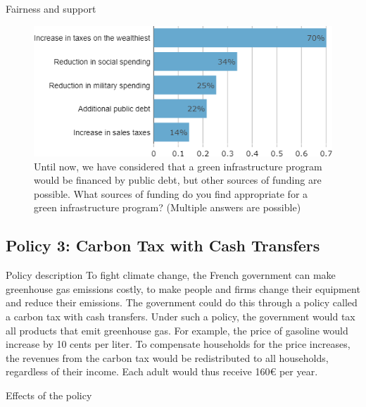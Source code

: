 \begin{framefont}{\small}
\begin{frame}{Fairness and support}
\end{frame}

\begin{frame}{}%
\begin{figure}[h!]
\centering
\caption{Until now, we have considered that a green infrastructure program would be financed by public debt, but other sources of funding are possible.
What sources of funding do you find appropriate for a green infrastructure program? (Multiple answers are possible)}
\includegraphics[width=.7\paperwidth]{../figures/FR/investments_funding_FR.png}
\end{figure}
\end{frame}

\subsection{Policy 3: Carbon Tax with Cash Transfers}

\begin{frame}{Policy description}%
To fight climate change, the French government can make greenhouse gas emissions costly, to make people and firms change their equipment and reduce their emissions. The government could do this through a policy called a carbon tax with cash transfers. Under such a policy, the government would tax all products that emit greenhouse gas. For example, the price of gasoline would increase by 10 cents per liter. To compensate households for the price increases, the revenues from the carbon tax would be redistributed to all households, regardless of their income. Each adult would thus receive 160\euro{} per year.
\end{frame}

\begin{frame}{Effects of the policy}%
%


\end{frame}
\end{framefont}
